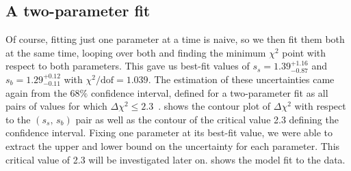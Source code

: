 \documentclass[11pt]{article}
\newcommand{\chisq}{\chi^2}
\newcommand{\chisqdof}{\chi^2/\mathrm{dof}}
\numberwithin{equation}{section}
\numberwithin{figure}{section}
\numberwithin{table}{section}
\begin{document}
\subsection{A two-parameter fit}\label{sec:twoParamFit}
Of course, fitting just one parameter at a time is naive, so we then fit them both at the same time, looping over both and finding the minimum $\chisq$ point with respect to both parameters. This gave us best-fit values of $s_s=1.39^{+1.16}_{-0.87}$ and $s_b=1.29^{+0.12}_{-0.11}$ with $\chisqdof=1.039$. The estimation of these uncertainties came again from the $68\%$ confidence interval, defined for a two-parameter fit as all pairs of values for which $\Delta\chisq\leq2.3$~\cite{XRay_energy_spectra}.  shows the contour plot of $\Delta\chisq$ with respect to the $(s_s,\,s_b)$ pair as well as the contour of the critical value 2.3 defining the confidence interval. Fixing one parameter at its best-fit value, we were able to extract the upper and lower bound on the uncertainty for each parameter. This critical value of 2.3 will be investigated later on.  shows the model fit to the data.
\end{document}

